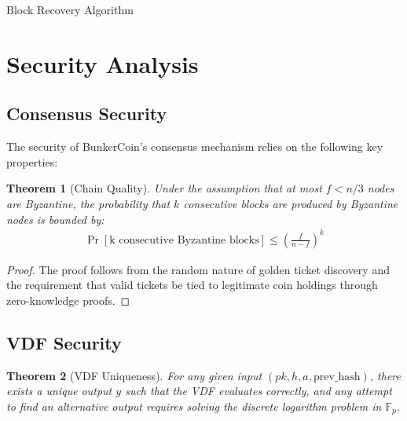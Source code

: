 \documentclass[11pt,a4paper]{article}
\newtheorem{theorem}{Theorem}[section]
\begin{document}
\begin{algorithm}[H]
\SetAlgoLined
{}
\caption{Block Recovery Algorithm}

\Return{$\perp$}\;
\end{algorithm}

\section{Security Analysis}

\subsection{Consensus Security}

The security of BunkerCoin's consensus mechanism relies on the following key properties:

\begin{theorem}[Chain Quality]
Under the assumption that at most $f < n/3$ nodes are Byzantine, the probability that $k$ consecutive blocks are produced by Byzantine nodes is bounded by:
\begin{align}
\Pr[\text{k consecutive Byzantine blocks}] \leq \left(\frac{f}{n-f}\right)^k
\end{align}
\end{theorem}

\begin{proof}
The proof follows from the random nature of golden ticket discovery and the requirement that valid tickets be tied to legitimate coin holdings through zero-knowledge proofs.
\end{proof}

\subsection{VDF Security}

\begin{theorem}[VDF Uniqueness]
For any given input $(pk, h, a, \text{prev\_hash})$, there exists a unique output $y$ such that the VDF evaluates correctly, and any attempt to find an alternative output requires solving the discrete logarithm problem in $\mathbb{F}_p$.
\end{theorem}
\end{document}
